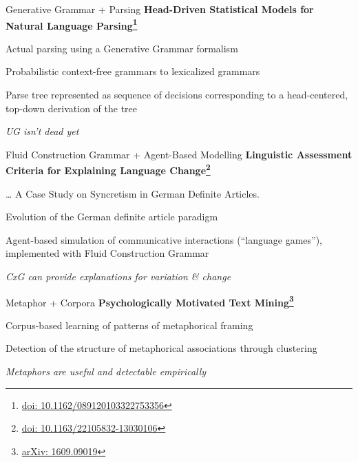 \documentclass[aspectratio=169,cramped]{beamer}
\let\tempone\itemize
\let\temptwo\enditemize
\renewenvironment{itemize}{\tempone\addtolength{\itemsep}{-0\baselineskip}\addtolength{\parskip}{-0.2\baselineskip}}{\temptwo}
\newcommand*{\doi}[1]{\href{http://doai.io/#1}{doi: #1}}
\begin{document}
\begin{frame}{Generative Grammar + Parsing}
	\textbf{Head-Driven Statistical Models for Natural Language Parsing\footnote{\protect\doi{10.1162/089120103322753356}}}
  \begin{itemize}
  \item Actual parsing using a Generative Grammar formalism
  \item Probabilistic context-free grammars to lexicalized grammars
  \item Parse tree represented as sequence of decisions corresponding to a head-centered,
    top-down derivation of the tree
  \item \textit{UG isn't dead yet}
  \end{itemize}
\end{frame}

\begin{frame}{Fluid Construction Grammar + Agent-Based Modelling}
	\textbf{Linguistic Assessment Criteria for Explaining Language Change\footnote{\protect\doi{10.1163/22105832-13030106}}}
  \begin{itemize}
  \item \ldots{} A Case Study on Syncretism in German Definite Articles.%
  \item Evolution of the German definite article paradigm
  \item Agent-based simulation of communicative interactions (``language games''), implemented with
    Fluid Construction Grammar
  \item \textit{CxG can provide explanations for variation \& change}
  \end{itemize}
\end{frame}

\begin{frame}{Metaphor + Corpora}
	\textbf{Psychologically Motivated Text Mining\footnote{\protect\href{http://arxiv.org/abs/1609.09019}{arXiv: 1609.09019}}}
  \begin{itemize}
  \item Corpus-based learning of patterns of metaphorical framing
  \item Detection of the structure of metaphorical associations through clustering
  \item \textit{Metaphors are useful and detectable empirically}
  \end{itemize}
\end{frame}
\end{document}

